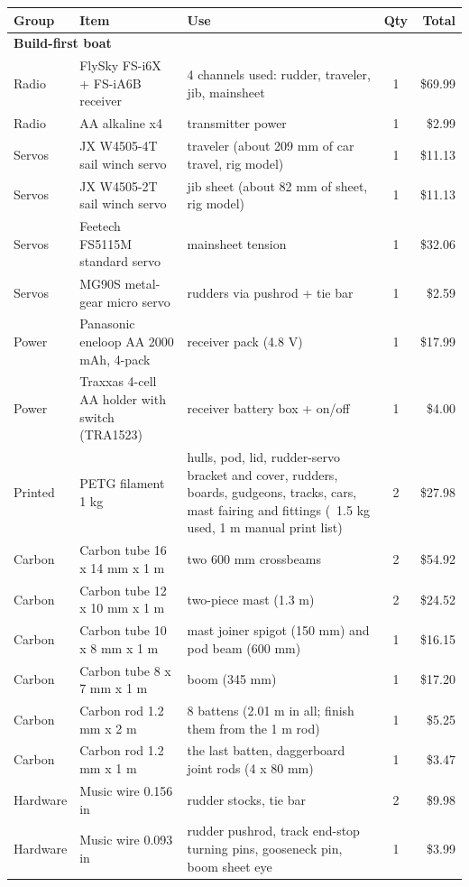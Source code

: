 \documentclass[11pt]{article}
\begin{document}
{\small
\begin{longtable}{p{1.6cm}p{4.4cm}p{6.6cm}cr}
\toprule
Group & Item & Use & Qty & Total \\
\midrule
\multicolumn{5}{l}{\textbf{Build-first boat}}\\
Radio & FlySky FS-i6X + FS-iA6B receiver & 4 channels used: rudder, traveler, jib, mainsheet & 1 & \$69.99 \\
Radio & AA alkaline x4 & transmitter power & 1 & \$2.99 \\
Servos & JX W4505-4T sail winch servo & traveler (about 209 mm of car travel, rig model) & 1 & \$11.13 \\
Servos & JX W4505-2T sail winch servo & jib sheet (about 82 mm of sheet, rig model) & 1 & \$11.13 \\
Servos & Feetech FS5115M standard servo & mainsheet tension & 1 & \$32.06 \\
Servos & MG90S metal-gear micro servo & rudders via pushrod + tie bar & 1 & \$2.59 \\
Power & Panasonic eneloop AA 2000 mAh, 4-pack & receiver pack (4.8 V) & 1 & \$17.99 \\
Power & Traxxas 4-cell AA holder with switch (TRA1523) & receiver battery box + on/off & 1 & \$4.00 \\
Printed & PETG filament 1 kg & hulls, pod, lid, rudder-servo bracket and cover, rudders, boards, gudgeons, tracks, cars, mast fairing and fittings (~1.5 kg used, 1 m manual print list) & 2 & \$27.98 \\
Carbon & Carbon tube 16 x 14 mm x 1 m & two 600 mm crossbeams & 2 & \$54.92 \\
Carbon & Carbon tube 12 x 10 mm x 1 m & two-piece mast (1.3 m) & 2 & \$24.52 \\
Carbon & Carbon tube 10 x 8 mm x 1 m & mast joiner spigot (150 mm) and pod beam (600 mm) & 1 & \$16.15 \\
Carbon & Carbon tube 8 x 7 mm x 1 m & boom (345 mm) & 1 & \$17.20 \\
Carbon & Carbon rod 1.2 mm x 2 m & 8 battens (2.01 m in all; finish them from the 1 m rod) & 1 & \$5.25 \\
Carbon & Carbon rod 1.2 mm x 1 m & the last batten, daggerboard joint rods (4 x 80 mm) & 1 & \$3.47 \\
Hardware & Music wire 0.156 in & rudder stocks, tie bar & 2 & \$9.98 \\
Hardware & Music wire 0.093 in & rudder pushrod, track end-stop turning pins, gooseneck pin, boom sheet eye & 1 & \$3.99 \\

\end{longtable}}
\end{document}
